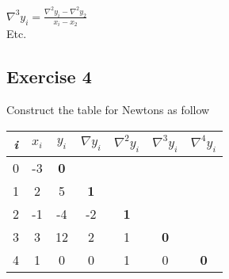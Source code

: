 \documentclass[12pt]{article}
\begin{document}
$ \nabla ^3 y_i = \frac{\nabla ^2 y_i - \nabla ^2 y_2}{x_i-x_2} $ \\

Etc.

\subsection{Exercise 4}

Construct the table for Newton\textquotesingle s as follow

\begin{table}[H]
\centering
\begin{tabular}{|c|c|c|c|c|c|c|}
\hline
\textit{i} & $x_i$ & $y_i$ & $\nabla y_i$ & $\nabla ^2 y_i$ & $\nabla ^3 y_i$ & $\nabla ^4 y_i$ \\ \hline
0 & -3 & \textbf{0} &  &  &  &  \\ \hline
1 & 2 & 5 & \textbf{1} &  &  &  \\ \hline
2 & -1 & -4 & -2 & \textbf{1} &  &  \\ \hline
3 & 3 & 12 & 2 & 1 & \textbf{0} &  \\ \hline
4 & 1 & 0 & 0 & 1 & 0 & \textbf{0} \\ \hline
\end{tabular}
\end{table}
\end{document}

